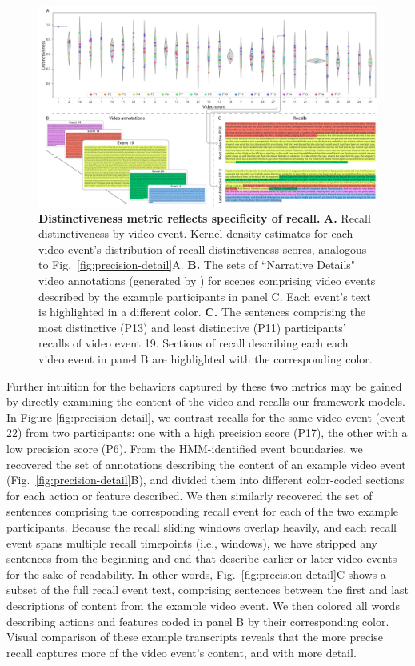 \documentclass{article}
\begin{document}
\begin{figure}[t]
  \centering
  \includegraphics[width=1\textwidth]{figs/distinctiveness_detail}
  \caption{\small \textbf{Distinctiveness metric reflects specificity of recall.} \textbf{A.} Recall distinctiveness by video event.  Kernel density estimates for each video event's distribution of recall distinctiveness scores, analogous to Fig.~\ref{fig:precision-detail}A.  \textbf{B.} The sets of ``Narrative Details" video annotations (generated by \citealp{ChenEtal17}) for scenes comprising video events described by the example participants in panel C.  Each event's text is highlighted in a different color.  \textbf{C.} The sentences comprising the most distinctive (P13) and least distinctive (P11) participants' recalls of video event 19.  Sections of recall describing each each video event in panel B are highlighted with the corresponding color.}
  \label{fig:distinctiveness-detail}
\end{figure}

Further intuition for the behaviors captured by these two metrics may be gained by directly examining the content of the video and recalls our framework models.  In Figure \ref{fig:precision-detail}, we contrast recalls for the same video event (event 22) from two participants: one with a high precision score (P17), the other with a low precision score (P6).  From the HMM-identified event boundaries, we recovered the set of annotations describing the content of an example video event (Fig.~\ref{fig:precision-detail}B), and divided them into different color-coded sections for each action or feature described.  We then similarly recovered the set of sentences comprising the corresponding recall event for each of the two example participants.  Because the recall sliding windows overlap heavily, and each recall event spans multiple recall timepoints (i.e., windows), we have stripped any sentences from the beginning and end that describe earlier or later video events for the sake of readability.  In other words, Fig.~\ref{fig:precision-detail}C shows a subset of the full recall event text, comprising sentences between the first and last descriptions of content from the example video event.  We then colored all words describing actions and features coded in panel B by their corresponding color.  Visual comparison of these example transcripts reveals that the more precise recall captures more of the video event's content, and with more detail.
\end{document}
